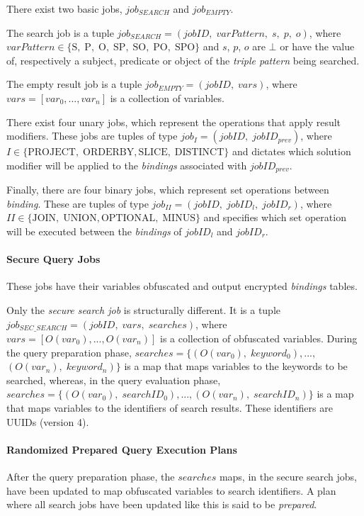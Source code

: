 There exist two basic jobs, $job_{SEARCH}$ and $job_{EMPTY}$.

The search job is a tuple $job_{SEARCH} = (jobID, \; varPattern, \; s, \; p, \; o)$, where $varPattern \in \{ \textrm{S}, \; \textrm{P}, \; \textrm{O}, \; \textrm{SP}, \; \textrm{SO}, \; \textrm{PO}, \; \textrm{SPO} \}$ and $s$, $p$, $o$ are $\bot$ or have the value of, respectively a subject, predicate or object of the \emph{triple pattern} being searched.

The empty result job is a tuple $job_{EMPTY} = (jobID, \; vars)$, where $vars = [var_0, ..., var_n]$ is a collection of variables.

There exist four unary jobs, which represent the operations that apply result modifiers. These jobs are tuples of type $job_{I} = ( jobID, \; jobID_{prev} )$, where $I \in \{ \textrm{PROJECT}, \; \textrm{ORDERBY}, \allowbreak \textrm{SLICE}, \; \textrm{DISTINCT} \}$ and dictates which solution modifier will be applied to the \emph{bindings} associated with $jobID_{prev}$.

Finally, there are four binary jobs, which represent set operations between \emph{binding}. These are tuples of type $job_{II} = ( jobID, \; jobID_l,  \; jobID_r )$, where $II \in \{ \textrm{JOIN}, \; \textrm{UNION}, \allowbreak \textrm{OPTIONAL},  \; \textrm{MINUS} \}$ and specifies which set operation will be executed between the \emph{bindings} of $jobID_l$ and $jobID_r$.

\paragraph{Secure Query Jobs} These jobs have their variables obfuscated and output encrypted \emph{bindings} tables.

Only the \emph{secure search job} is structurally different. It is a tuple $job_{SEC\_SEARCH} = (jobID, \; vars, \; searches)$, where $vars = [O(var_0), ..., \allowbreak O(var_n)]$ is a collection of obfuscated variables. During the query preparation phase, $searches = \{(O(var_0), \; keyword_0), ..., $\linebreak$ (O(var_n), \; keyword_n)\}$ is a map that maps variables to the keywords to be searched, whereas, in the query evaluation phase, $searches = \{(O(var_0), \; searchID_0), ...,  (O(var_n), \; searchID_n)\}$ is a map that maps variables to the identifiers of search results. These identifiers are \gls{UUID}s (version 4).

\paragraph{Randomized Prepared Query Execution Plans} After the query preparation phase, the $searches$ maps, in the secure search jobs, have been updated to map obfuscated variables to search identifiers. A plan where all search jobs have been updated like this is said to be \textit{prepared}.

